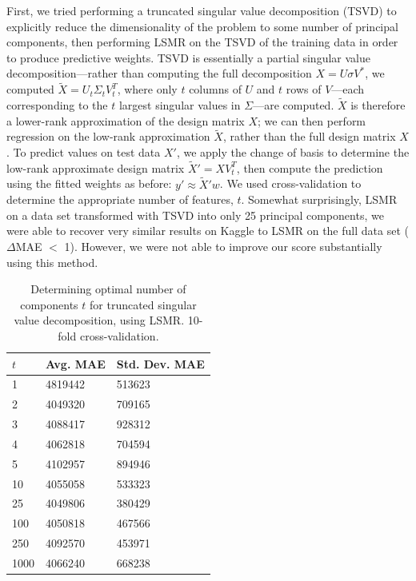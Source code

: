\documentclass[11pt]{amsart}
\begin{document}
First, we tried performing a truncated singular value decomposition (TSVD) to explicitly reduce the dimensionality of the problem to some number of principal components, then performing LSMR on the TSVD of the training data in order to produce predictive weights. TSVD is essentially a partial singular value decomposition---rather than computing the full decomposition $X = U \sigma V^*$, we computed $\tilde{X} = U_t \Sigma_t V_t^T$, where only $t$ columns of $U$ and $t$ rows of $V$---each corresponding to the $t$ largest singular values in $\Sigma$---are computed. $\tilde{X}$ is therefore a lower-rank approximation of the design matrix $X$; we can then perform regression on the low-rank approximation $\tilde{X}$, rather than the full design matrix $X$. To predict values on test data $X'$, we apply the change of basis to determine the low-rank approximate design matrix $\tilde{X}' = XV_t^T$, then compute the prediction using the fitted weights as before: $y' \approx \tilde{X}' w$. We used cross-validation to determine the appropriate number of features, $t$. Somewhat surprisingly, LSMR on a data set transformed with TSVD into only 25 principal components, we were able to recover very similar results on Kaggle to LSMR on the full data set ($\Delta$MAE $<$ 1). However, we were not able to improve our score substantially using this method.

\begin{table}[h]
\begin{tabular}{@{}lll@{}}
\toprule
$t$           & Avg. MAE & Std. Dev. MAE \\ \midrule
1             & 4819442  & 513623        \\
2             & 4049320  & 709165        \\
3             & 4088417  & 928312        \\
4             & 4062818  & 704594        \\
5             & 4102957  & 894946        \\
10            & 4055058  & 533323        \\
25            & 4049806  & 380429        \\
100           & 4050818  & 467566        \\
250           & 4092570  & 453971        \\
1000          & 4066240  & 668238        \\ \bottomrule
\end{tabular}
\caption{Determining optimal number of components $t$ for truncated singular value decomposition, using LSMR. 10-fold cross-validation.}
\end{table}
\end{document}
